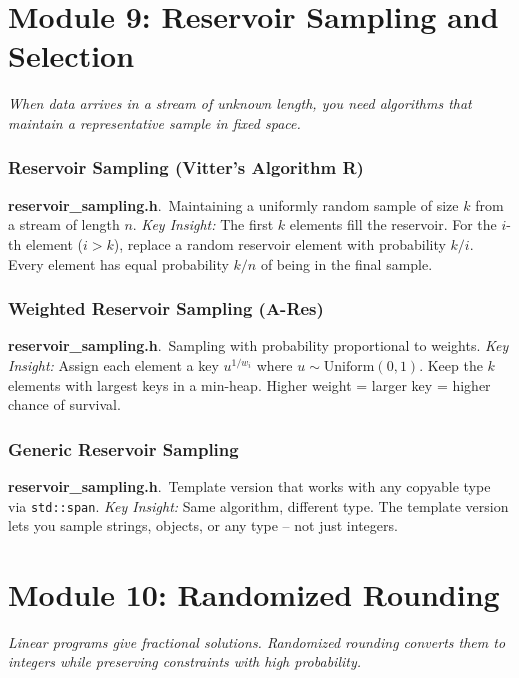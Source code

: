 \documentclass[11pt,a4paper]{article}
\newcommand{\algo}[2]{\textbf{#1}.\ #2}
\newcommand{\insight}{\textit{Key Insight: }}
\begin{document}
\section{Module 9: Reservoir Sampling and Selection}
\label{sec:sampling}

\textit{When data arrives in a stream of unknown length, you need algorithms that maintain a representative sample in fixed space.}

\subsubsection{Reservoir Sampling (Vitter's Algorithm R)}
\algo{reservoir\_sampling.h}{Maintaining a uniformly random sample of size \(k\) from a stream of length \(n\).}
\insight The first \(k\) elements fill the reservoir. For the \(i\)-th element (\(i > k\)), replace a random reservoir element with probability \(k/i\). Every element has equal probability \(k/n\) of being in the final sample.

\subsubsection{Weighted Reservoir Sampling (A-Res)}
\algo{reservoir\_sampling.h}{Sampling with probability proportional to weights.}
\insight Assign each element a key \(u^{1/w_i}\) where \(u \sim \text{Uniform}(0,1)\). Keep the \(k\) elements with largest keys in a min-heap. Higher weight = larger key = higher chance of survival.

\subsubsection{Generic Reservoir Sampling}
\algo{reservoir\_sampling.h}{Template version that works with any copyable type via \texttt{std::span}.}
\insight Same algorithm, different type. The template version lets you sample strings, objects, or any type -- not just integers.

\section{Module 10: Randomized Rounding}
\label{sec:rounding}

\textit{Linear programs give fractional solutions. Randomized rounding converts them to integers while preserving constraints with high probability.}
\end{document}
